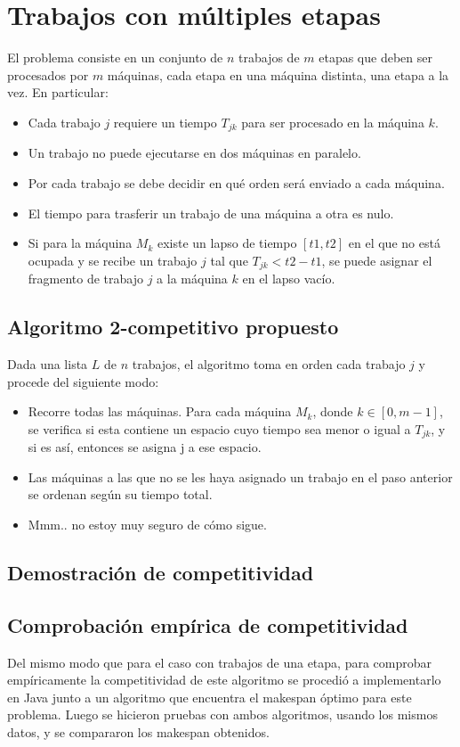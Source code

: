 \documentclass[12pt,letterpaper]{article}
\begin{document}
\section{Trabajos con múltiples etapas}
El problema consiste en un conjunto de $n$ trabajos de $m$ etapas que deben ser procesados por $m$ máquinas, cada etapa en una máquina distinta, una etapa a la vez. En particular:

\begin{itemize}
\item Cada trabajo $j$ requiere un tiempo $T_{jk}$ para ser procesado en la máquina $k$.
\item Un trabajo no puede ejecutarse en dos máquinas en paralelo.
\item Por cada trabajo se debe decidir en qué orden será enviado a cada máquina.
\item El tiempo para trasferir un trabajo de una máquina a otra es nulo.
\item Si para la máquina $M_{k}$ existe un lapso de tiempo $[t1, t2]$ en el que no está ocupada y se recibe un trabajo $j$ tal que $T_{jk} < t2 - t1$, se puede asignar el fragmento de trabajo $j$ a la máquina $k$ en el lapso vacío.
\end{itemize}

\subsection{Algoritmo 2-competitivo propuesto}
	Dada una lista $L$ de $n$ trabajos, el algoritmo toma en orden cada trabajo $j$ y procede del siguiente modo:
	
\begin{itemize}
\item Recorre todas las máquinas. Para cada máquina $M_{k}$, donde $k \in [0, m-1]$, se verifica si esta contiene un espacio cuyo tiempo sea menor o igual a $T_{jk}$, y si es así, entonces se asigna j a ese espacio.
\item Las máquinas a las que no se les haya asignado un trabajo en el paso anterior se ordenan según su tiempo total.
\item Mmm.. no estoy muy seguro de cómo sigue.
\end{itemize}
	
\subsection{Demostración de competitividad}

\subsection{Comprobación empírica de competitividad}
Del mismo modo que para el caso con trabajos de una etapa, para comprobar empíricamente la competitividad de este algoritmo se procedió a implementarlo en Java junto a un algoritmo que encuentra el makespan óptimo para este problema. Luego se hicieron pruebas con ambos algoritmos, usando los mismos datos, y se compararon los makespan obtenidos.
\end{document}
